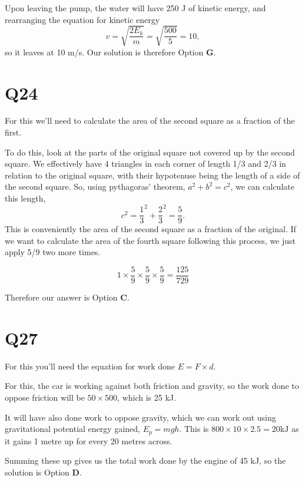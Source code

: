 \documentclass[11pt]{article}
\begin{document}
Upon leaving the pump, the water will have 250 J of kinetic energy, and rearranging the equation for kinetic energy
\begin{equation*}
v = \sqrt{\frac{2E_k}{m}} = \sqrt{\frac{500}{5}} = 10,
\end{equation*}
so it leaves at 10 m/s.  Our solution is therefore Option \textbf{G}.

\section*{Q24}
For this we'll need to calculate the area of the second square as a fraction of the first.  

To do this, look at the parts of the original square not covered up by the second square.  We effectively have 4 triangles in each corner of length 1/3 and 2/3 in relation to the original square, with their hypotenuse being the length of a side of the second square.  So, using pythagoras' theorem, $a^2+b^2=c^2$, we can calculate this length,
\begin{equation*}
c^2 = \frac{1}{3}^2 + \frac{2}{3}^2 = \frac{5}{9}.
\end{equation*} 
This is conveniently the area of the second square as a fraction of the original.  If we want to calculate the area of the fourth square following this process, we just apply 5/9 two more times.

\begin{equation*}
1 \times \frac{5}{9} \times \frac{5}{9} \times \frac{5}{9} = \frac{125}{729}
\end{equation*}

Therefore our answer is Option \textbf{C}.

\section*{Q27}
For this you'll need the equation for work done $E=F\times d$.

For this, the car is working against both friction and gravity, so the work done to oppose friction will be $50\times500$, which is 25 kJ.  

It will have also done work to oppose gravity, which we can work out using gravitational potential energy gained, $E_p=mgh$.  This is $800\times 10\times 2.5 = 20 \mathrm{kJ}$ as it gains 1 metre up for every 20 metres across.

Summing these up gives us the total work done by the engine of 45 kJ, so the solution is Option \textbf{D}.
\end{document}
